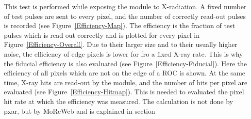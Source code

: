 \documentclass[a4paper,12pt,twoside]{article}
\begin{document}
This test is performed while exposing the module to X-radiation. A fixed number of test pulses are sent to every pixel, and the number of correctly read-out pulses is recorded (see Figure~\ref{Efficiency-Map}). The efficiency is the fraction of test pulses which is read out correctly and is plotted for every pixel in Figure~\ref{Efficiency-Overall}. Due to their larger size and to their usually higher noise, the efficiency of edge pixels is lower for fro a fixed X-ray rate. This is why the fiducial efficiency is also evaluated (see Figure~\ref{Efficiency-Fiducial}). Here
the efficiency of all pixels which are not on the edge of a ROC is shown. At the same time, X-ray hits are read-out by the module, and the number of hits per pixel are evaluated (see Figure~\ref{Efficiency-Hitmap}). This is needed to evaluated the pixel hit rate at which the efficiency was measured. The calculation is not done by pxar, but by MoReWeb and is explained in section%
\end{document}
